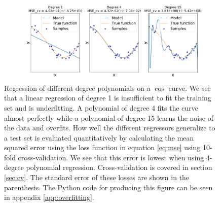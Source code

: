 \begin{figure}
    \centering
    \includegraphics[width=\textwidth,keepaspectratio]{over_underfitting.pdf}
    \caption{Regression of different degree polynomials on a $\cos$ curve. We see that a linear regression of degree 1 is insufficient to fit the training set and is underfitting. A polynomial of degree 4 fits the curve almost perfectly while a polynomial of degree 15 learns the noise of the data and overfits. How well the different regressors generalize to a test set is evaluated quantitatively by calculating the mean squared error using the loss function in equation \ref{eq:mse} using 10-fold cross-validation. We see that this error is lowest when using 4-degree polynomial regression. Cross-validation is covered in section \ref{sec:cv}. The standard error of these losses are shown in the parenthesis. The Python code for producing this figure can be seen in appendix \ref{app:overfitting}.}
    \label{fig:regr_example}
\end{figure}
\noindent

